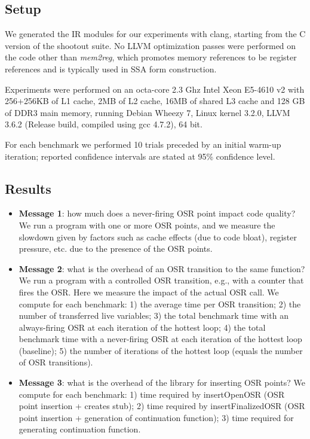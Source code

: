 \subsection{Setup}

We generated the IR modules for our experiments with clang, starting from the C version of the shootout suite. No LLVM optimization passes were performed on the code other than {\em mem2reg}, which promotes memory references to be register references and is typically used in SSA form construction.

Experiments were performed on an octa-core 2.3 Ghz Intel Xeon E5-4610 v2 with 256+256KB of L1 cache, 2MB of L2 cache, 16MB of shared L3 cache and 128 GB of DDR3 main memory, running Debian Wheezy 7, Linux kernel 3.2.0, LLVM 3.6.2 (Release build, compiled using gcc 4.7.2), 64 bit.

For each benchmark we performed 10 trials preceded by an initial warm-up iteration; reported confidence intervals are stated at 95\% confidence level.

\subsection{Results}

\begin{itemize}
\item {\bf Message 1}: how much does a never-firing OSR point impact code quality? We run a program with one or more OSR points, and we measure the slowdown given by factors such as cache effects (due to code bloat), register pressure, etc. due to the presence of the OSR points.
\item {\bf Message 2}: what is the overhead of an OSR transition to the same function? We run a program with a controlled OSR transition, e.g., with a counter that fires the OSR. Here we measure the impact of the actual OSR call. We compute for each benchmark: 1) the average time per OSR transition; 2) the number of transferred live variables; 3) the total benchmark time with an always-firing OSR at each iteration of the hottest loop; 4) the total benchmark time with a never-firing OSR at each iteration of the hottest loop (baseline); 5) the number of iterations of the hottest loop (equals the number of OSR transitions).
\item {\bf Message 3}: what is the overhead of the library for inserting OSR points? We compute for each benchmark: 1) time required by insertOpenOSR (OSR point insertion + creates stub); 2) time required by insertFinalizedOSR (OSR point insertion + generation of continuation function); 3) time required for generating continuation function.
\end{itemize}


